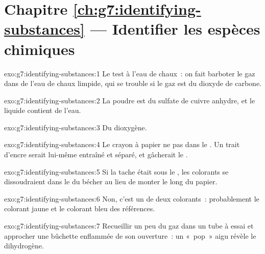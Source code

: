 \section*{Chapitre \ref{ch:g7:identifying-substances} --- Identifier les espèces chimiques}

\begin{solution}{exo:g7:identifying-substances:1}
Le test à l'eau de chaux~: on fait barboter le gaz dans de l'eau de chaux
limpide, qui se trouble si le gaz est du dioxyde de carbone.
\end{solution}

\begin{solution}{exo:g7:identifying-substances:2}
La poudre est du sulfate de cuivre anhydre, et le liquide contient de
l'eau.
\end{solution}

\begin{solution}{exo:g7:identifying-substances:3}
Du dioxygène.
\end{solution}

\begin{solution}{exo:g7:identifying-substances:4}
Le crayon à papier ne  pas dans le . Un trait d'encre
serait lui-même entraîné et séparé, et gâcherait le .
\end{solution}

\begin{solution}{exo:g7:identifying-substances:5}
Si la tache était sous le , les colorants se dissoudraient dans
le  du bécher au lieu de monter le long du papier.
\end{solution}

\begin{solution}{exo:g7:identifying-substances:6}
Non, c'est un  de deux colorants~: probablement le colorant jaune
et le colorant bleu des références.
\end{solution}

\begin{solution}{exo:g7:identifying-substances:7}
Recueillir un peu du gaz dans un tube à essai et approcher une bûchette
enflammée de son ouverture~: un «~pop~» aigu révèle le dihydrogène.
\end{solution}

